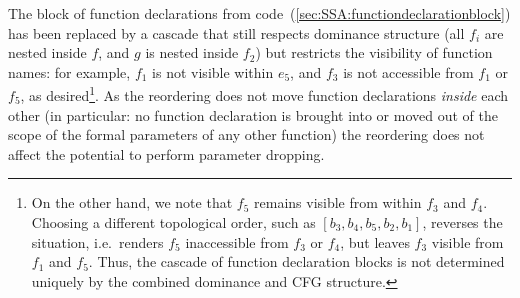 The block of function declarations from
code~(\ref{sec:SSA:functiondeclarationblock}) has been replaced by a
cascade that still respects dominance structure (all $f_i$ are nested
inside $f$, and $g$ is nested inside $f_2$) but restricts the
visibility of function names: for example, $f_1$ is not visible within
$e_5$, and $f_3$ is not accessible from $f_1$ or $f_5$, as
desired\footnote{On the other hand, we note that $f_5$ remains visible
from within $f_3$ and $f_4$. Choosing a different topological order,
such as $[b_3,b_4,b_5,b_2,b_1]$, reverses the situation, i.e.~renders
$f_5$ inaccessible from $f_3$ or $f_4$, but leaves $f_3$ visible from
$f_1$ and $f_5$. Thus, the cascade of function declaration blocks is
not determined uniquely by the combined dominance and CFG structure.}.
As the reordering does not move function declarations \emph{inside}
each other (in particular: no function declaration is brought into or
moved out of the scope of the formal parameters of any other function)
the reordering does not affect the potential to perform parameter
dropping.
\\

